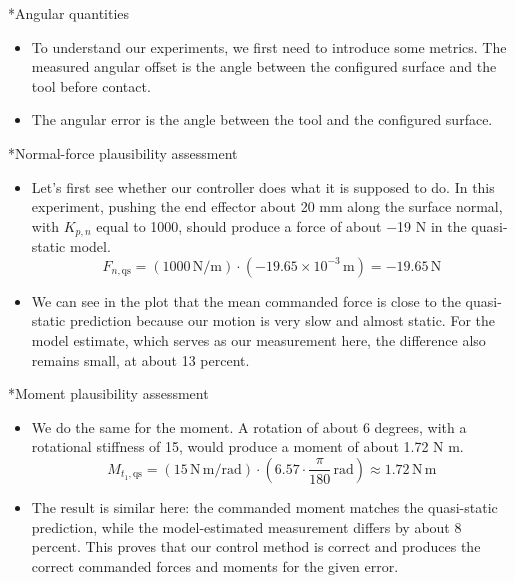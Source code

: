 \documentclass[12pt,a4paper]{article}
\makeatletter
\renewcommand\section{\@startsection{section}{1}{0pt}{14pt}{6pt}{\normalfont\Large\bfseries\color{navy}}}
\makeatother
\begin{document}
\section*{Angular quantities}
\begin{itemize}
\item To understand our experiments, we first need to introduce some metrics. The measured angular offset is the angle between the configured surface and the tool before contact.
\item The angular error is the angle between the tool and the configured surface.
\end{itemize}

\section*{Normal-force plausibility assessment}
\begin{itemize}
\item Let's first see whether our controller does what it is supposed to do. In this experiment, pushing the end effector about 20 mm along the surface normal, with \(K_{p,n}\) equal to 1000, should produce a force of about \ensuremath{-}19 N in the quasi-static model.
\[
F_{n,\mathrm{qs}}=(1000\,\mathrm{N/m})\cdot(-19.65\times10^{-3}\,\mathrm{m})=-19.65\,\mathrm{N}
\]
\item We can see in the plot that the mean commanded force is close to the quasi-static prediction because our motion is very slow and almost static. For the model estimate, which serves as our measurement here, the difference also remains small, at about 13 percent.
\end{itemize}

\section*{Moment plausibility assessment}
\begin{itemize}
\item We do the same for the moment. A rotation of about 6 degrees, with a rotational stiffness of 15, would produce a moment of about 1.72 N m.
\[
M_{t_1,\mathrm{qs}}=(15\,\mathrm{N\,m/rad})\cdot(6.57\cdot\frac{\pi}{180}\,\mathrm{rad})\approx1.72\,\mathrm{N\,m}
\]
\item The result is similar here: the commanded moment matches the quasi-static prediction, while the model-estimated measurement differs by about 8 percent. This proves that our control method is correct and produces the correct commanded forces and moments for the given error.
\end{itemize}
\end{document}
